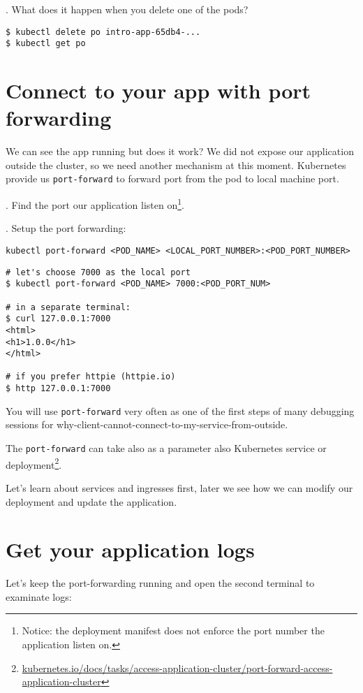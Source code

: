 \documentclass[12pt, letterpaper]{article}
\begin{document}
. What does it happen when you delete one of the pods?
\begin{verbatim}
$ kubectl delete po intro-app-65db4-...
$ kubectl get po
\end{verbatim}

\section{Connect to your app with port forwarding}

We can see the app running but does it work? We did not expose our application outside the cluster, so we need another mechanism at this moment. Kubernetes provide us \verb|port-forward| to forward port from the pod to local machine port.

. Find the port our application listen on\footnote{Notice: the deployment manifest does not enforce the port number the application listen on.}.

. Setup the port forwarding:

\begin{verbatim}
kubectl port-forward <POD_NAME> <LOCAL_PORT_NUMBER>:<POD_PORT_NUMBER>
\end{verbatim}

\begin{verbatim}
# let's choose 7000 as the local port
$ kubectl port-forward <POD_NAME> 7000:<POD_PORT_NUM>

# in a separate terminal:
$ curl 127.0.0.1:7000
<html>
<h1>1.0.0</h1>
</html>

# if you prefer httpie (httpie.io)
$ http 127.0.0.1:7000
\end{verbatim}

\smallskip

You will use \verb|port-forward| very often as one of the first steps of many debugging sessions for why-client-cannot-connect-to-my-service-from-outside.

\bigskip

The \verb|port-forward| can take also as a parameter also Kubernetes service or deployment\footnote{\href{https://kubernetes.io/docs/tasks/access-application-cluster/port-forward-access-application-cluster/}{kubernetes.io/docs/tasks/access-application-cluster/port-forward-access-application-cluster}}.

\bigskip
Let's learn about services and ingresses first, later
we see how we can modify our deployment and update the application.

\section{Get your application logs}
Let's keep the port-forwarding running and open the second terminal to examinate logs:
\end{document}
